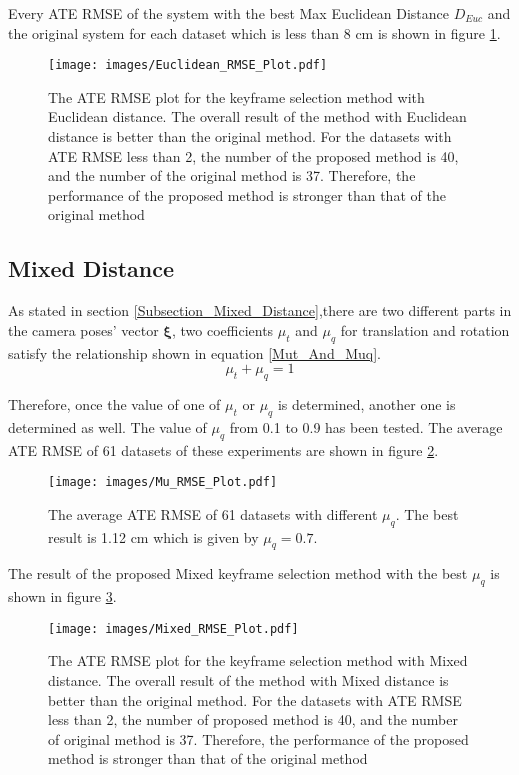 Every ATE RMSE of the system with the best Max Euclidean Distance $D_{Euc}$ and the original system for each dataset which is less than 8 cm is shown in figure \ref{Euclidean_RMSE_Plot}.
\begin{figure}[thb]
    \centering
    \texttt{[image: images/Euclidean\_RMSE\_Plot.pdf]}
    \caption[The ATE RMSE plot for the keyframe selection method with Euclidean distance]{The ATE RMSE plot for the keyframe selection method with Euclidean distance. The overall result of the method with Euclidean distance is better than the original method. For the datasets with ATE RMSE less than 2, the number of the proposed method is 40, and the number of the original method is 37. Therefore, the performance of the proposed method is stronger than that of the original method}\label{Euclidean_RMSE_Plot}
\end{figure}

\subsection{Mixed Distance}
As stated in section \ref{Subsection_Mixed_Distance},there are two different parts in the camera poses' vector $\boldsymbol{\xi}$, two coefficients $\mu_{t}$ and $\mu_{q}$ for translation and rotation satisfy the relationship shown in equation \ref{Mut_And_Muq}.
\begin{equation}
    \mu_{t} + \mu_{q} = 1
    \label{Mut_And_Muq}
\end{equation}

Therefore, once the value of one of $\mu_{t}$ or $\mu_{q}$ is determined, another one is determined as well. The value of $\mu_{q}$ from 0.1 to 0.9 has been tested. The average ATE RMSE of 61 datasets of these experiments are shown in figure \ref{Mu_RMSE_Plot}.
\begin{figure}[thb]
    \centering
    \texttt{[image: images/Mu\_RMSE\_Plot.pdf]}
    \caption[The average ATE RMSE of 61 datasets with different $\mu_q$]{The average ATE RMSE of 61 datasets with different $\mu_q$. The best result is 1.12 cm which is given by $\mu_q=0.7$.}\label{Mu_RMSE_Plot}
\end{figure}

The result of the proposed Mixed keyframe selection method with the best $\mu_q$ is shown in figure \ref{Mixed_RMSE_Plot}.
\begin{figure}[thb]
    \centering
    \texttt{[image: images/Mixed\_RMSE\_Plot.pdf]}
    \caption[The ATE RMSE plot for the keyframe selection method with Mixed distance]{The ATE RMSE plot for the keyframe selection method with Mixed distance. The overall result of the method with Mixed distance is better than the original method. For the datasets with ATE RMSE less than 2, the number of proposed method is 40, and the number of original method is 37. Therefore, the performance of the proposed method is stronger than that of the original method}\label{Mixed_RMSE_Plot}
\end{figure}

